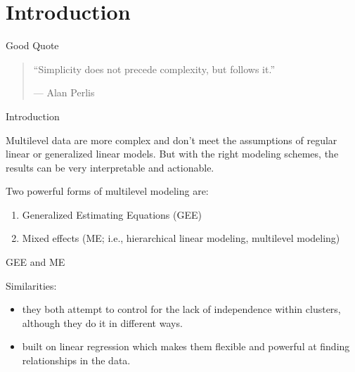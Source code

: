 \section{Introduction}\label{introduction}

\begin{frame}{Good Quote}

\begin{quote}
``Simplicity does not precede complexity, but follows it.''

--- Alan Perlis
\end{quote}

\end{frame}

\begin{frame}{Introduction}

Multilevel data are more complex and don't meet the assumptions of
regular linear or generalized linear models. But with the right modeling
schemes, the results can be very interpretable and actionable.

Two powerful forms of multilevel modeling are:

\begin{enumerate}
\def\labelenumi{\arabic{enumi}.}
\tightlist
\item
  Generalized Estimating Equations (GEE)
\item
  Mixed effects (ME; i.e., hierarchical linear modeling, multilevel
  modeling)
\end{enumerate}

\end{frame}

\begin{frame}{GEE and ME}

Similarities:

\begin{itemize}
\tightlist
\item
  they both attempt to control for the lack of independence within
  clusters, although they do it in different ways.
\item
  built on linear regression which makes them flexible and powerful at
  finding relationships in the data.
\end{itemize}

\end{frame}

